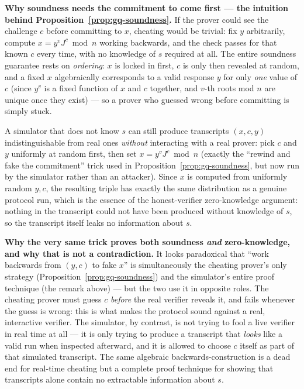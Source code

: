 \medskip\noindent\textbf{Why soundness needs the commitment to come first — the intuition behind Proposition~\ref{prop:gq-soundness}.} If the prover could see the challenge $c$ before committing to $x$, cheating would be trivial: fix $y$ arbitrarily, compute $x=y^vJ^c\bmod n$ working backwards, and the check passes for that known $c$ every time, with no knowledge of $s$ required at all. The entire soundness guarantee rests on \emph{ordering}: $x$ is locked in first, $c$ is only then revealed at random, and a fixed $x$ algebraically corresponds to a valid response $y$ for only \emph{one} value of $c$ (since $y^v$ is a fixed function of $x$ and $c$ together, and $v$-th roots mod $n$ are unique once they exist) — so a prover who guessed wrong before committing is simply stuck.

\begin{remark}
A simulator that does not know $s$ can still produce transcripts $(x,c,y)$ indistinguishable from real ones \emph{without} interacting with a real prover: pick $c$ and $y$ uniformly at random first, then set $x = y^v J^c \bmod n$ (exactly the ``rewind and fake the commitment'' trick used in Proposition~\ref{prop:gq-soundness}, but now run by the simulator rather than an attacker). Since $x$ is computed from uniformly random $y,c$, the resulting triple has exactly the same distribution as a genuine protocol run, which is the essence of the honest-verifier zero-knowledge argument: nothing in the transcript could not have been produced without knowledge of $s$, so the transcript itself leaks no information about $s$.
\end{remark}

\medskip\noindent\textbf{Why the very same trick proves both soundness \emph{and} zero-knowledge, and why that is not a contradiction.} It looks paradoxical that ``work backwards from $(y,c)$ to fake $x$'' is simultaneously the cheating prover's only strategy (Proposition~\ref{prop:gq-soundness}) and the simulator's entire proof technique (the remark above) — but the two use it in opposite roles. The cheating prover must guess $c$ \emph{before} the real verifier reveals it, and fails whenever the guess is wrong: this is what makes the protocol sound against a real, interactive verifier. The simulator, by contrast, is not trying to fool a live verifier in real time at all — it is only trying to produce a transcript that \emph{looks} like a valid run when inspected afterward, and it is allowed to choose $c$ itself as part of that simulated transcript. The same algebraic backwards-construction is a dead end for real-time cheating but a complete proof technique for showing that transcripts alone contain no extractable information about $s$.

